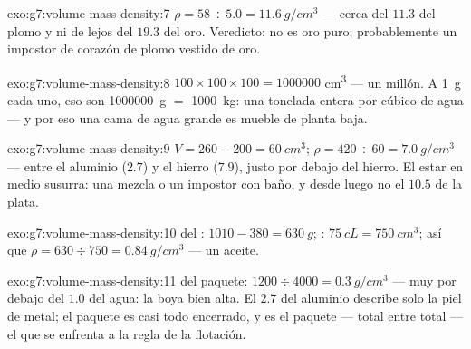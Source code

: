 \begin{solution}{exo:g7:volume-mass-density:7}
$\rho = 58 \div 5.0 = \qty{11.6}{g/cm^3}$ --- cerca del $11.3$ del
plomo y ni de lejos del $19.3$ del oro. Veredicto: no es oro puro;
probablemente un impostor de corazón de plomo vestido de oro.
\end{solution}

\begin{solution}{exo:g7:volume-mass-density:8}
$100 \times 100 \times 100 = 1000000$ \unit{cm^3} --- un millón. A
\qty{1}{g} cada uno, eso son \qty{1000000}{g} $=$ \qty{1000}{kg}: una
tonelada entera por  cúbico de agua --- y por eso una cama de
agua grande es mueble de planta baja.
\end{solution}

\begin{solution}{exo:g7:volume-mass-density:9}
$V = 260 - 200 = \qty{60}{cm^3}$;
$\rho = 420 \div 60 = \qty{7.0}{g/cm^3}$ --- entre el aluminio
($2.7$) y el hierro ($7.9$), justo por debajo del hierro. El estar en
medio susurra: una mezcla o un impostor con baño, y desde luego no el
$10.5$ de la plata.
\end{solution}

\begin{solution}{exo:g7:volume-mass-density:10}
 del : $1010 - 380 = \qty{630}{g}$;
: $\qty{75}{cL} = \qty{750}{cm^3}$; así que
$\rho = 630 \div 750 = \qty{0.84}{g/cm^3}$ --- un aceite.
\end{solution}

\begin{solution}{exo:g7:volume-mass-density:11}
 del paquete: $1200 \div 4000 = \qty{0.3}{g/cm^3}$ ---
muy por debajo del $1.0$ del agua: la boya  bien alta. El
$2.7$ del aluminio describe solo la piel de metal; el paquete es casi
todo  encerrado, y es el paquete ---  total entre
 total --- el que se enfrenta a la regla de la flotación.
\end{solution}

